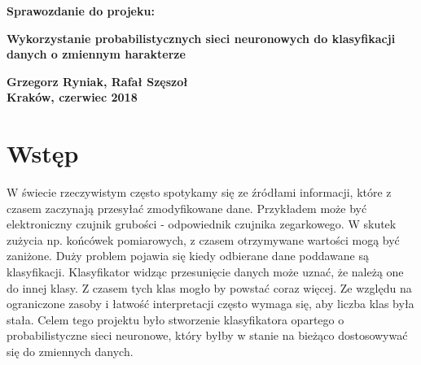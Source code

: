 \documentclass[10pt,a4paper]{article}
\author{Ryniak}
\begin{document}

\thispagestyle{empty}
\vspace*{50ex}
\begin{center}
{\bf\LARGE\textsf{Sprawozdanie do projeku:}}\\
\vspace{5ex}

{\bf\huge\textsf{Wykorzystanie probabilistycznych sieci neuronowych do klasyfikacji danych o zmiennym harakterze}}\\
\vspace{54ex}

{\bf\Large\textsf{Grzegorz Ryniak, Rafał Szęszoł}}\\
\vspace{22ex}
\textsf{\bf\large\textsf{Kraków, czerwiec 2018}}
\end{center}


\newpage

\section{Wstęp}
W świecie rzeczywistym często spotykamy się ze źródłami informacji, które z czasem zaczynają przesyłać zmodyfikowane dane. Przykładem może być elektroniczny czujnik grubości - odpowiednik czujnika zegarkowego. W skutek zużycia np. końcówek pomiarowych, z czasem otrzymywane wartości mogą być zaniżone. Duży problem pojawia się kiedy odbierane dane poddawane są klasyfikacji. Klasyfikator widząc przesunięcie danych może uznać, że należą one do innej klasy. Z czasem tych klas mogło by powstać coraz więcej. Ze względu na ograniczone zasoby i łatwość interpretacji często wymaga się, aby liczba klas była stała. Celem tego projektu było stworzenie klasyfikatora opartego o probabilistyczne sieci neuronowe, który byłby w stanie na bieżąco dostosowywać się do zmiennych danych. 
\end{document}
